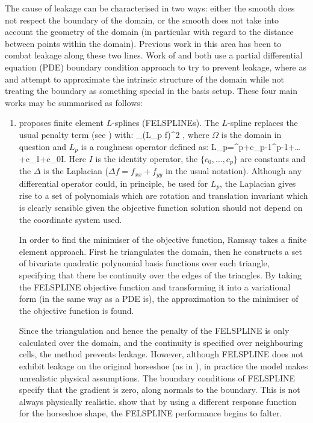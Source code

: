The cause of leakage can be characterised in two ways: either the smooth does not respect the boundary of the domain, or the smooth does not take into account the geometry of the domain (in particular with regard to the distance between points within the domain). Previous work in this area has been to combat leakage along these two lines. Work of \cite{ramsay} and \cite{soap} both use a partial differential equation (PDE) boundary condition approach to try to prevent leakage, where as \cite{wangranalli} and \cite{eilerstalk}  attempt to approximate the intrinsic structure of the domain while not treating the boundary as something special in the basis setup. These four main works may be summarised as follows:

\begin{enumerate}
\item \cite{ramsay} proposes finite element $L$-splines (FELSPLINEs). The $L$-spline replaces the usual penalty term (see ) with:
\be
\int_\Omega (L_p f)^2 \Omega,
\ee
where $\Omega$ is the domain in question and $L_p$ is a roughness operator defined as:
\be
L_p=\Delta^p+c_{p-1}\Delta^{p-1}+\dots+c_1\Delta+c_0I.
\ee
Here $I$ is the identity operator, the $\{c_0,\dots, c_p\}$ are constants and the $\Delta$ is the Laplacian ($\Delta f = f_{xx}+f_{yy}$ in the usual notation). Although any differential operator could, in principle, be used for $L_p$, the Laplacian gives rise to a set of polynomials which are rotation and translation invariant which is clearly sensible given the objective function solution should not depend on the coordinate system used.

In order to find the minimiser of the objective function, Ramsay takes a finite element approach. First he triangulates the domain, then he constructs a set of bivariate quadratic polynomial basis functions over each triangle, specifying that there be continuity over the edges of the triangles. By taking the FELSPLINE objective function and transforming it into a variational form (in the same way as a PDE is), the approximation to the minimiser of the objective function is found. 

Since the triangulation and hence the penalty of the FELSPLINE is only calculated over the domain, and the continuity is specified over neighbouring cells, the method prevents leakage. However, although FELSPLINE does not exhibit leakage on the original horseshoe (as in ), in practice the model makes unrealistic physical assumptions. The boundary conditions of FELSPLINE specify that the gradient is zero, along normals to the boundary. This is not always physically realistic. \cite{soap} show that by using a different response function for the horseshoe shape, the FELSPLINE performance begins to falter.


\end{enumerate}
